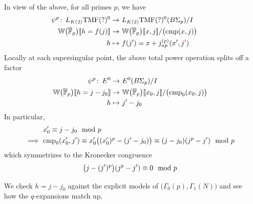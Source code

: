 \documentclass{rs}
\theoremstyle{definition}
\theoremstyle{remark}
\def\co{\colon\thinspace}
\newcommand{\mb}[1]{\mathbb{#1}}
\newcommand{\cF}{\overline {\mb F}}
\newcommand{\cmp}{{\rm cmp}}
\newcommand{\BW}{{\mb W}}
\newcommand{\md}{~~{\rm mod}~}
\newcommand{\TMF}{{\rm TMF}}
\newcommand{\G}{\Gamma}
\newcommand{\lb}{\llbracket}
\newcommand{\rb}{\rrbracket}
\renewcommand{\=}{\approx}
\renewcommand{\-}{\sim}
\newcommand{\rd}[1]{{\textcolor{red}{#1}}}
\numberwithin{equation}{section}
\begin{document}
In view of the above, for all primes $p$, we have 
\[
 \begin{split}
        \psi^p \co L_{K(2)}\TMF(?)^0 \to & ~ L_{K(2)}\TMF(?)^0(B\Sigma_p) / I \hskip .8cm \\
  \BW\big(\cF_p\big)\lb h = f(j) \rb \to & ~ \BW\big(\cF_p\big)\lb x,j \rb / \big(\cmp(x,j)\big) \\
                               h \mapsto & ~ f(j') = x + j_{u p}^{(p)}(x',j\rd{'}) 
 \end{split}
\]
Locally at each supersingular point, the above total power operation splits off a factor 
\[
 \begin{split}
                         \psi^p \co E^0 \to & ~ E^0(B\Sigma_p) / I \\
  \BW\big(\cF_p\big)\lb h = j - j_0 \rb \to & ~ \BW\big(\cF_p\big)\lb x_0,j \rb / \big(\cmp_0(x_0,j)\big) \\
                                  h \mapsto & ~ j' - j_0 
 \end{split}
\]
In particular, 
\[
 \begin{split}
           & ~ x_0' \equiv j - j_0 \md p \\
  \implies & ~ \cmp_0(x_0',j') \equiv x_0' \big((x_0')^p - (j' - j_0) \big) \equiv (j - j_0) (j^p - j') \md p 
 \end{split}
\]
which symmetrizes to the Kronecker congruence 
\[
 \big(j - (j')^p\big) (j^p - j') \equiv 0 \md p 
\]

We check $h = j - j_0$ against the explicit models of $\big(\G_0(p),\G_1(N)\big)$ and see how the $q$-expansions match up.  
\end{document}
